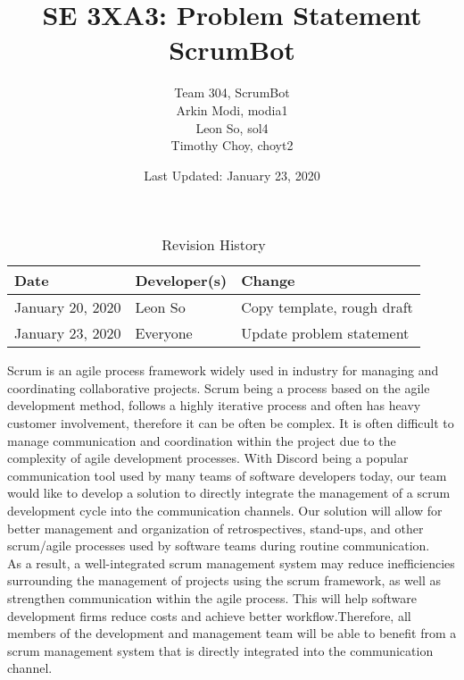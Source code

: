 \documentclass[12pt]{article}
\title{SE 3XA3: Problem Statement\\ScrumBot}
\author{
	Team 304, ScrumBot
		\\ Arkin Modi, modia1
        \\ Leon So, sol4
        \\ Timothy Choy, choyt2
}
\date{Last Updated: January 23, 2020}
\begin{document}
\begin{table}[hp]
    \caption{Revision History} \label{TblRevisionHistory}
    \begin{tabularx}{\textwidth}{llX}
        \toprule
            \textbf{Date} & \textbf{Developer(s)} & \textbf{Change}\\
        \midrule
            January 20, 2020 & Leon So & Copy template, rough draft\\
            January 23, 2020 & Everyone & Update problem statement\\
        \bottomrule
    \end{tabularx}
\end{table}
\newpage

\maketitle

Scrum is an agile process framework widely used in industry for managing and coordinating collaborative projects. Scrum being a process based on the agile development method, follows a highly iterative process and often has heavy customer involvement, therefore it can be often be complex. It is often difficult to manage communication and coordination within the project due to the complexity of agile development processes. With Discord being a popular communication tool used by many teams of software developers today, our team would like to develop a solution to directly integrate the management of a scrum development cycle into the communication channels. Our solution will allow for better management and organization of retrospectives, stand-ups, and other scrum/agile processes used by software teams during routine communication.\\

As a result, a well-integrated scrum management system may reduce inefficiencies surrounding the management of projects using the scrum framework, as well as strengthen communication within the agile process. This will help software development firms reduce costs and achieve better workflow.Therefore, all members of the development and management team will be able to benefit from a scrum management system that is directly integrated into the communication channel.
\end{document}
